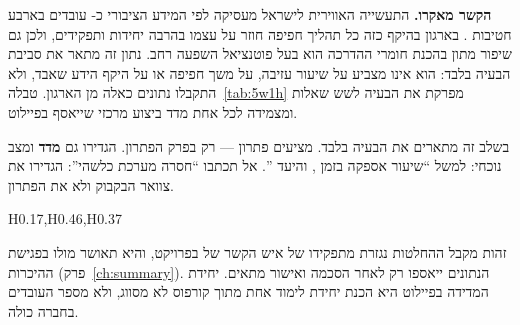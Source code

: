 \textbf{הקשר מאקרו.} התעשייה האווירית לישראל  מעסיקה לפי המידע הציבורי כ- עובדים בארבע
חטיבות \cite{iai2025about}. בארגון בהיקף כזה כל תהליך חפיפה חוזר על עצמו בהרבה יחידות ותפקידים, ולכן גם שיפור מתון
בהכנת חומרי ההדרכה הוא בעל פוטנציאל השפעה רחב. נתון זה מתאר את סביבת הבעיה בלבד: הוא אינו מצביע על שיעור
עזיבה, על משך חפיפה או על היקף הידע שאבד, ולא התקבלו נתונים כאלה מן הארגון. טבלה~\ref{tab:5w1h} מפרקת את הבעיה
לשש שאלות ומצמידה לכל אחת מדד ביצוע מרכזי  שייאסף בפיילוט.
\begin{pcguide}[כלל]
בשלב זה מתארים את הבעיה בלבד. מציעים פתרון --- רק בפרק הפתרון. הגדירו גם \textbf{מדד} ומצב נוכחי:
למשל “שיעור אספקה בזמן , והיעד ”. אל תכתבו “חסרה מערכת כלשהי”: הגדירו את צוואר הבקבוק ולא את הפתרון.
\end{pcguide}
\begin{table}[!htbp]
\centering
\caption{הגדרת הבעיה בשיטת ; המצב הארגוני יימדד בפיילוט}\label{tab:5w1h}
\begin{pctable}{H{0.17},H{0.46},H{0.37}}
\end{pctable}
\end{table}
זהות מקבל ההחלטות נגזרת מתפקידו של איש הקשר של  בפרויקט, והיא תאושר מולו בפגישת ההיכרות (פרק~\ref{ch:summary}).
הנתונים ייאספו רק לאחר הסכמה ואישור מתאים. יחידת המדידה בפיילוט היא הכנת יחידת לימוד אחת מתוך קורפוס לא מסווג,
ולא מספר העובדים בחברה כולה.

